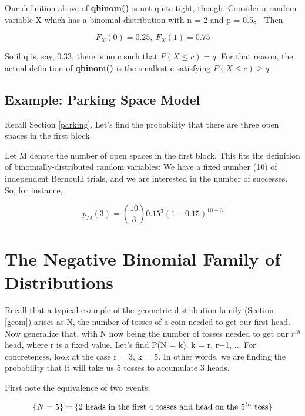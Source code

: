 Our definition above of {\bf qbinom()} is not quite tight, though.
Consider a random variable X which has a binomial distribution with n =
2 and p = 0.5。  Then

\begin{equation}
F_X(0) = 0.25, ~ F_X(1) = 0.75
\end{equation}

So if q is, say, 0.33, there is no c such that $P(X \leq c) = q$.  For
that reason, the actual definition of {\bf qbinom()} is the smallest c
satisfying $P(X \leq c) \ge q$.

\subsection{Example:  Parking Space Model}

Recall Section \ref{parking}.  Let's find the probability that there are
three open spaces in the first block.

Let M denote the number of open spaces in the first block.  This fits
the definition of binomially-distributed random variables:  We have a
fixed number (10) of independent Bernoulli trials, and we are interested
in the number of successes.  So, for instance,

\begin{equation}
p_{M}(3) = \binom{10}{3} 0.15^3 (1 - 0.15)^{10-3}
\end{equation}


\section{The Negative Binomial Family of Distributions}
\label{negbin}

Recall that a typical example of the geometric distribution family
(Section \ref{geom}) arises as N, the number of tosses of a coin needed
to get our first head.  Now generalize that, with N now being the number
of tosses needed to get our $r^{th}$ head, where r is a fixed value.
Let's find P(N = k), k = r, r+1, ...  For concreteness, look at the case
r = 3, k = 5.  In other words, we are finding the probability that it
will take us 5 tosses to accumulate 3 heads.

First note the equivalence of two events: 

\begin{equation}
\{N = 5\} = \{2 {\rm ~heads~in~the~first~} 4 {\rm ~tosses~and~head~on~the~}
5^{th} {\rm ~toss} \}
\end{equation}

